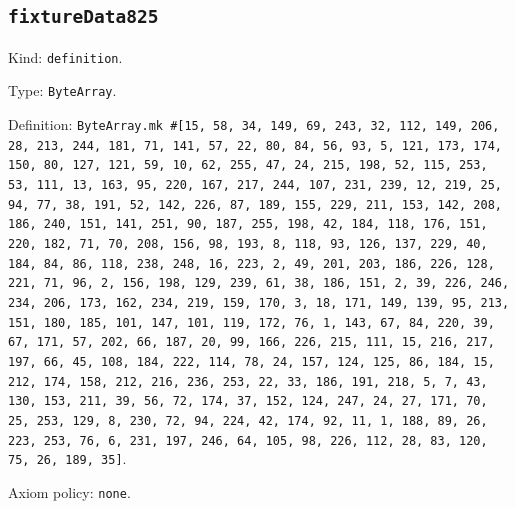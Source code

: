 \documentclass[11pt]{article}
\begin{document}
\subsection*{\texttt{fixtureData825}}
\noindent Kind: \texttt{definition}.\par
\noindent Type: \texttt{ByteArray}.\par
\noindent Definition: \texttt{ByteArray.mk \#[15, 58, 34, 149, 69, 243, 32, 112, 149, 206, 28, 213, 244, 181, 71, 141, 57, 22, 80, 84, 56, 93, 5, 121, 173, 174, 150, 80, 127, 121, 59, 10, 62, 255, 47, 24, 215, 198, 52, 115, 253, 53, 111, 13, 163, 95, 220, 167, 217, 244, 107, 231, 239, 12, 219, 25, 94, 77, 38, 191, 52, 142, 226, 87, 189, 155, 229, 211, 153, 142, 208, 186, 240, 151, 141, 251, 90, 187, 255, 198, 42, 184, 118, 176, 151, 220, 182, 71, 70, 208, 156, 98, 193, 8, 118, 93, 126, 137, 229, 40, 184, 84, 86, 118, 238, 248, 16, 223, 2, 49, 201, 203, 186, 226, 128, 221, 71, 96, 2, 156, 198, 129, 239, 61, 38, 186, 151, 2, 39, 226, 246, 234, 206, 173, 162, 234, 219, 159, 170, 3, 18, 171, 149, 139, 95, 213, 151, 180, 185, 101, 147, 101, 119, 172, 76, 1, 143, 67, 84, 220, 39, 67, 171, 57, 202, 66, 187, 20, 99, 166, 226, 215, 111, 15, 216, 217, 197, 66, 45, 108, 184, 222, 114, 78, 24, 157, 124, 125, 86, 184, 15, 212, 174, 158, 212, 216, 236, 253, 22, 33, 186, 191, 218, 5, 7, 43, 130, 153, 211, 39, 56, 72, 174, 37, 152, 124, 247, 24, 27, 171, 70, 25, 253, 129, 8, 230, 72, 94, 224, 42, 174, 92, 11, 1, 188, 89, 26, 223, 253, 76, 6, 231, 197, 246, 64, 105, 98, 226, 112, 28, 83, 120, 75, 26, 189, 35]}.\par
\noindent Axiom policy: \texttt{none}.\par
\end{document}

